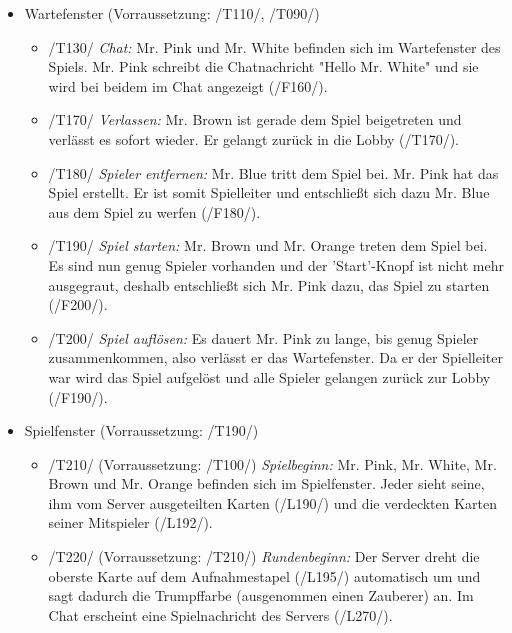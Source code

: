\documentclass{article}
\begin{document}
\begin{itemize}
\begin{itemize}
	\end{itemize}
	
	\item Wartefenster (Vorraussetzung: /T110/, /T090/)
	
	\begin{itemize}
		
		\item /T130/ \textit{Chat:} Mr. Pink und Mr. White befinden sich im Wartefenster des Spiels. Mr. Pink schreibt die Chatnachricht "Hello Mr. White" und sie wird bei beidem im Chat angezeigt (/F160/).
		
		\item /T170/ \textit{Verlassen:} Mr. Brown ist gerade dem Spiel beigetreten und verlässt es sofort wieder. Er gelangt zurück in die Lobby (/T170/).
		
		\item /T180/ \textit{Spieler entfernen:} Mr. Blue tritt dem Spiel bei. Mr. Pink hat das Spiel erstellt. Er ist somit Spielleiter und entschließt sich dazu Mr. Blue aus dem Spiel zu werfen (/F180/). 
		
		\item /T190/ \textit{Spiel starten:} Mr. Brown und Mr. Orange treten dem Spiel bei. Es sind nun genug Spieler vorhanden und der 'Start'-Knopf ist nicht mehr ausgegraut, deshalb entschließt sich Mr. Pink dazu, das Spiel zu starten (/F200/).
		
		\item /T200/ \textit{Spiel auflösen:} Es dauert Mr. Pink zu lange, bis genug Spieler zusammenkommen, also verlässt er das Wartefenster. Da er der Spielleiter war wird das Spiel aufgelöst und alle Spieler gelangen zurück zur Lobby (/F190/).
		 
	\end{itemize}

	\item Spielfenster (Vorraussetzung: /T190/)
	
	\begin{itemize}
	
		\item /T210/ (Vorraussetzung: /T100/) \textit{Spielbeginn:} Mr. Pink, Mr. White, Mr. Brown und Mr. Orange befinden sich im Spielfenster. Jeder sieht seine, ihm vom Server ausgeteilten Karten (/L190/) und die verdeckten Karten seiner Mitspieler (/L192/).  
		
		\item /T220/ (Vorraussetzung: /T210/) \textit{Rundenbeginn:} Der Server dreht die oberste Karte auf dem Aufnahmestapel (/L195/) automatisch um und sagt dadurch die Trumpffarbe (ausgenommen einen Zauberer) an. Im Chat erscheint eine Spielnachricht des Servers (/L270/).
	

\end{itemize}
\end{itemize}
\end{document}

